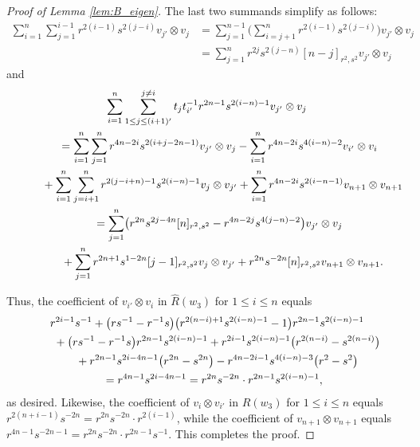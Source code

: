 \documentclass[10pt,a4paper]{amsart}
\numberwithin{equation}{section}
\begin{document}
\begin{proof}[Proof of Lemma \ref{lem:B_eigen}]
The last two summands simplify as follows:
\begin{align*}
 \sum_{i = 1}^{n}\sum_{j = 1}^{i - 1} r^{2(i - 1)}s^{2(j - i)} v_{j'} \otimes v_{j} &{}=
 \sum_{j = 1}^{n-1} \Biggl( \sum_{i = j + 1}^{n}r^{2(i - 1)}s^{2(j - i)} \Biggr) v_{j'}\otimes v_{j}\\
 &{} =
 \sum_{j = 1}^{n}r^{2j}s^{2(j - n)}[n-j]_{r^{2},s^{2}}v_{j'} \otimes v_{j}
\end{align*}
and
\begin{gather*}
 \sum_{i = 1}^{n}\sum_{1\leq j\leq (i + 1)'}^{j \neq i} t_{j}t_{i'}^{-1}r^{2n - 1}s^{2(i - n) - 1}v_{j'} \otimes v_{j} \\
 \qquad{}= \sum_{i = 1}^{n}\sum_{j = 1}^{n} r^{4n - 2i}s^{2(i + j - 2n - 1)}v_{j'} \otimes v_{j} -
 \sum_{i = 1}^{n} r^{4n - 2i}s^{4(i - n) - 2} v_{i'} \otimes v_{i} \\
 \qquad\hphantom{=}{} + \sum_{i = 1}^{n}\sum_{j = i + 1}^{n} r^{2(j - i + n) - 1}s^{2(i - n) - 1}v_{j} \otimes v_{j'}
 + \sum_{i = 1}^{n} r^{4n -2i}s^{2(i - n - 1)} v_{n + 1} \otimes v_{n + 1} \\
 \qquad{} = \sum_{j = 1}^{n}\bigl(r^{2n}s^{2j - 4n}[n]_{r^{2},s^{2}} - r^{4n - 2j}s^{4(j - n) - 2}\bigr) v_{j'} \otimes v_{j} \\
 \qquad\hphantom{=}{} + \sum_{j = 1}^{n} r^{2n + 1}s^{1 - 2n}[j - 1]_{r^{2},s^{2}} v_{j} \otimes v_{j'}+ r^{2n}s^{-2n}[n]_{r^{2},s^{2}}v_{n + 1} \otimes v_{n + 1}.
\end{gather*}


Thus, the coefficient of $v_{i'} \otimes v_{i}$ in $\hat{R}(w_3)$ for $1\leq i\leq n$ equals
\begin{gather*}
 r^{2i - 1}s^{-1} +
 \bigl(rs^{-1} - r^{-1}s\bigr)\bigl(r^{2(n - i) + 1}s^{2(i - n) - 1} - 1\bigr)r^{2n - 1}s^{2(i-n) - 1}\\
 \quad\hphantom{=}{} + \bigl(rs^{-1} - r^{-1}s\bigr)r^{2n - 1}s^{2(i - n) - 1}+r^{2i - 1}s^{2(i - n) - 1}\bigl(r^{2(n - i)} - s^{2(n - i)}\bigr) \\
 \quad\hphantom{=}{} + r^{2n - 1}s^{2i - 4n - 1}\bigl(r^{2n} - s^{2n}\bigr) - r^{4n - 2i - 1}s^{4(i - n) - 3}\bigl(r^{2} - s^{2}\bigr) \\
 \quad{} = r^{4n - 1}s^{2i - 4n - 1} = r^{2n}s^{-2n}\cdot r^{2n - 1}s^{2(i - n) - 1},
\end{gather*}
as desired.
Likewise, the coefficient of $v_{i} \otimes v_{i'}$ in $\hat{R}(w_3)$ for $1\leq i\leq n$ equals $r^{2(n + i - 1)}s^{-2n} = r^{2n}s^{-2n}\cdot r^{2(i - 1)}$, while the coefficient of $v_{n+ 1} \otimes v_{n+1}$ equals $r^{4n - 1}s^{-2n - 1} = r^{2n}s^{-2n}\cdot r^{2n - 1}s^{-1}$. This completes the proof.
\end{proof}
\end{document}
